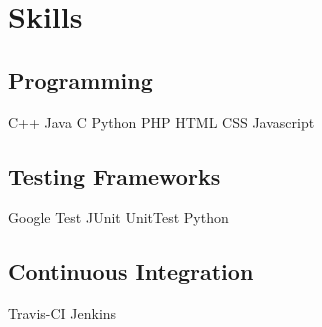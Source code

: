 \documentclass[]{deedy-resume-openfont}
\begin{document}
\begin{minipage}[t]{0.33\textwidth}

\section{Skills}
\subsection{Programming}
C++ \textbullet{} Java \textbullet{} C \textbullet{} Python \textbullet{} PHP \textbullet{} HTML \textbullet{} CSS \textbullet{} Javascript \\
\sectionsep

\subsection{Testing Frameworks}
Google Test \textbullet{} JUnit \textbullet{} UnitTest Python \\
\sectionsep

\subsection{Continuous Integration}
Travis-CI \textbullet{} Jenkins \\
\sectionsep

%
%

\end{minipage} 
\hfill
\end{document}
